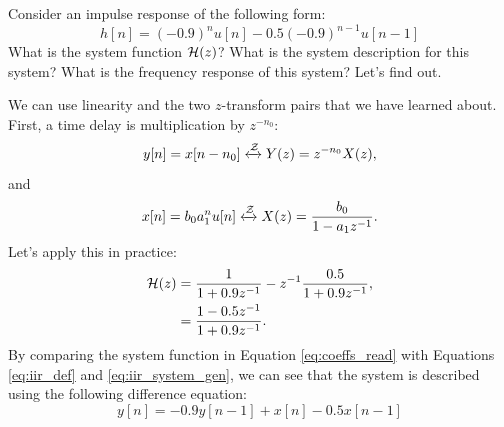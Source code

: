 Consider an impulse response of the following form:
\begin{equation}
h[n] = (-0.9)^n u[n] - 0.5(-0.9)^{n-1} u[n-1]
\label{eq:ex_ir}
\end{equation}
What is the system function $\mathcal{H}(z)$? What is the system description for
this system? What is the frequency response of this system? Let's find out.

We can use linearity and the two $z$-transform pairs that we have
learned about. First, a time delay is multiplication by $z^{-n_0}$:
\begin{equation}
y[n] = x[n-n_0] \xleftrightarrow{\mathcal{Z}} Y(z) = z^{-n_0}X(z),
\end{equation}
and 
\begin{equation}
x[n] = b_0 a_1^n u[n] \xleftrightarrow{\mathcal{Z}} X(z) = \frac{b_0}{1-a_1 z^{-1}}.
\end{equation}
Let's apply this in practice:
\begin{align}
\mathcal{H}(z) &= \frac{1}{1+0.9 z^{-1}} - z^{-1}\frac{0.5}{1+ 0.9 z^{-1}},\\
     &= \frac{1-0.5z^{-1}}{1+0.9 z^{-1}} \label{eq:coeffs_read}.
\end{align}
By comparing the system function in Equation \ref{eq:coeffs_read} with
Equations \ref{eq:iir_def} and \ref{eq:iir_system_gen}, we can see
that the system is described using the following difference equation:
\begin{equation}
y[n] = -0.9 y[n-1] +x[n] - 0.5x[n-1]
\end{equation}
